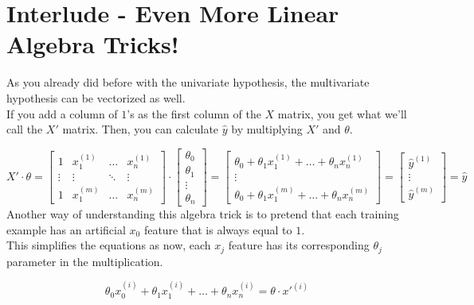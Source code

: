
\section*{Interlude - Even More Linear Algebra Tricks!}

As you already did before with the univariate hypothesis,
the multivariate hypothesis can be vectorized as well.\\
\newline
If you add a column of $1$'s as the first column of the $X$ matrix, you get what we'll call the $X'$ matrix.  
Then, you can calculate $\hat{y}$ by multiplying $X'$ and $\theta$.

$$
X' \cdot \theta = 
\begin{bmatrix} 
1 & x_{1}^{(1)} & \dots & x_{n}^{(1)}\\
\vdots & \vdots & \ddots & \vdots\\
1 & x_{1}^{(m)} & \dots &  x_{n}^{(m)}\end{bmatrix}
\cdot
\begin{bmatrix}
\theta_0 \\ 
\theta_1 \\
\vdots \\
\theta_n
\end{bmatrix} 
= 
\begin{bmatrix} 
\theta_0 + \theta_{1} x_{1}^{(1)} + \dots + \theta_{n} x_{n}^{(1)}\\ 
\vdots \\ 
\theta_0 + \theta_{1} x_{1}^{(m)} + \dots + \theta_{n} x_{n}^{(m)}
\end{bmatrix}
=
\begin{bmatrix}
\hat{y}^{(1)} \\ 
\vdots \\
\hat{y}^{(m)}
\end{bmatrix} 
=
\hat{y}
$$
Another way of understanding this algebra trick is to pretend that each training
example has an artificial $x_0$ feature that is always equal to $1$.\\
\newline
This simplifies the equations as now, each $x_j$ feature has its
corresponding $\theta_j$ parameter in the multiplication.

$$
\theta_0x_0^{(i)} + \theta_{1} x_{1}^{(i)} + \dots + \theta_{n} x_{n}^{(i)} = \theta \cdot x'^{(i)}
$$